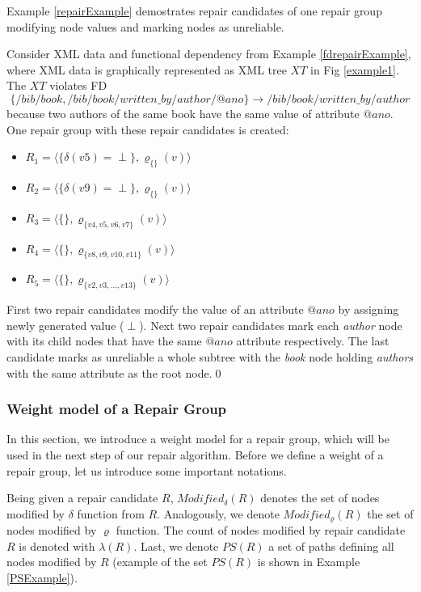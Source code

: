 Example \ref{repairExample} demostrates repair candidates of one repair group modifying node values and marking nodes as unreliable.

\begin{example}\label{repairExample}
Consider XML data and functional dependency from Example \ref{fdrepairExample}, where XML data is graphically represented as XML tree $XT$ in Fig \ref{example1}. The $XT$ violates FD $$\{/bib/book, /bib/book/written\_by/author/@ano\} \rightarrow /bib/book/written\_by/author$$ because two authors of the same book have the same value of attribute $@ano$. One repair group with these repair candidates is created:
\begin{itemize}
	\item $R_1 = \langle \{\delta(v5) = \perp\},\varrho_{\{\}}(v) \rangle$
    \item $R_2 = \langle \{\delta(v9) = \perp\},\varrho_{\{\}}(v) \rangle$
    \item $R_3 = \langle \{\},\varrho_{\{v4,v5,v6,v7\}}(v) \rangle$
    \item $R_4 = \langle \{\},\varrho_{\{v8,v9,v10,v11\}}(v) \rangle$
    \item $R_5 = \langle \{\},\varrho_{\{v2,v3,\dots,v13\}}(v) \rangle$
\end{itemize}

First two repair candidates modify the value of an attribute $@ano$ by assigning newly generated value ($\perp$). Next two repair candidates mark each \emph{author} node with its child nodes that have the same $@ano$ attribute respectively. The last candidate marks as unreliable a whole subtree with the \emph{book} node holding \emph{authors} with the same attribute as the root node.\qed
\end{example}

\subsubsection{Weight model of a Repair Group}

In this section, we introduce a weight model for a repair group, which will be used in the next step of our repair algorithm. Before we define a weight of a repair group, let us introduce some important notations.

Being given a repair candidate $R$, $Modified_\delta(R)$ denotes the set of nodes modified by $\delta$ function from $R$. Analogously, we denote $Modified_\varrho(R)$ the set of nodes modified by $\varrho$ function. The count of nodes modified by repair candidate $R$ is denoted with $\lambda(R)$. Last, we denote $PS(R)$ a set of paths defining all nodes modified by $R$ (example of the set $PS(R)$ is shown in Example \ref{PSExample}).

